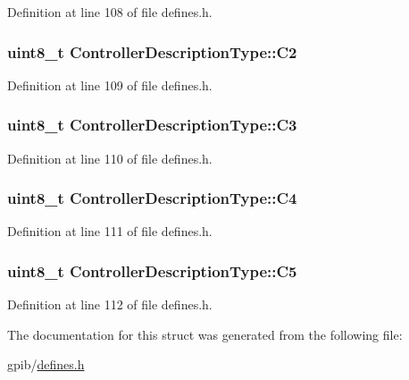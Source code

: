 Definition at line 108 of file defines.\-h.

\hypertarget{structControllerDescriptionType_ae2ac8a001bde9c68f92c6bb3a7287517}{
\subsubsection[{C2}]{\setlength{\rightskip}{0pt plus 5cm}uint8\-\_\-t Controller\-Description\-Type\-::\-C2}}\label{structControllerDescriptionType_ae2ac8a001bde9c68f92c6bb3a7287517}


Definition at line 109 of file defines.\-h.

\hypertarget{structControllerDescriptionType_ad24f2f797685ffd8f0bc96a800e5a6a8}{
\subsubsection[{C3}]{\setlength{\rightskip}{0pt plus 5cm}uint8\-\_\-t Controller\-Description\-Type\-::\-C3}}\label{structControllerDescriptionType_ad24f2f797685ffd8f0bc96a800e5a6a8}


Definition at line 110 of file defines.\-h.

\hypertarget{structControllerDescriptionType_abc2badc5707de3327d15a00919fb7e08}{
\subsubsection[{C4}]{\setlength{\rightskip}{0pt plus 5cm}uint8\-\_\-t Controller\-Description\-Type\-::\-C4}}\label{structControllerDescriptionType_abc2badc5707de3327d15a00919fb7e08}


Definition at line 111 of file defines.\-h.

\hypertarget{structControllerDescriptionType_a5b520889371f53fb89e36a0de5f071e9}{
\subsubsection[{C5}]{\setlength{\rightskip}{0pt plus 5cm}uint8\-\_\-t Controller\-Description\-Type\-::\-C5}}\label{structControllerDescriptionType_a5b520889371f53fb89e36a0de5f071e9}


Definition at line 112 of file defines.\-h.



The documentation for this struct was generated from the following file\-:\begin{DoxyCompactItemize}
\item 
gpib/\hyperlink{defines_8h}{defines.\-h}\end{DoxyCompactItemize}
